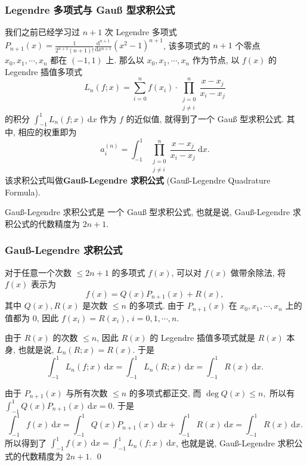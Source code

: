 
\begin{frame}
\frametitle{Legendre 多项式与 Gauß 型求积公式}

我们之前已经学习过 $n+1$ 次 Legendre 多项式 $P_{n+1}(x) = \frac{1}{2^{n+1} (n+1)!} \frac{\mathrm{d}^{n+1}}{\mathrm{d}x^{n+1}} (x^2 - 1)^{n+1}$, 该多项式的 $n+1$ 个零点 $x_0, x_1, \cdots, x_n$ 都在 $(-1, 1)$ 上. 那么以 $x_0, x_1, \cdots, x_n$ 作为节点, 以 $f(x)$ 的 Legendre 插值多项式
\[
L_n(f; x) = \sum_{i=0}^{n} f(x_i) \cdot \prod_{\substack{j=0 \\ j \neq i}}^{n} \frac{x - x_j}{x_i - x_j}
\]
的积分 $\int_{-1}^1 L_n(f; x) ~ \mathrm{d}x$ 作为 $f$ 的近似值, 就得到了一个 Gauß 型求积公式. 其中, 相应的权重即为
\[
a_i^{(n)} = \int_{-1}^1 \prod_{\substack{j=0 \\ j \neq i}}^{n} \frac{x - x_j}{x_i - x_j} ~ \mathrm{d}x.
\]
该求积公式叫做\textbf{Gauß-Legendre 求积公式} (Gauß-Legendre Quadrature Formula).

\pause

\begin{thm}
Gauß-Legendre 求积公式是 一个 Gauß 型求积公式, 也就是说, Gauß-Legendre 求积公式的代数精度为 $2n+1$.
\end{thm}

\end{frame}


\begin{frame}
\frametitle{Gauß-Legendre 求积公式}

\startproof[bg=yellow, fg=red]
对于任意一个次数 $\leqslant 2n+1$ 的多项式 $f(x)$, 可以对 $f(x)$ 做带余除法, 将 $f(x)$ 表示为
\[
f(x) = Q(x) P_{n+1}(x) + R(x),
\]
其中 $Q(x), R(x)$ 是次数 $\leqslant n$ 的多项式. 由于 $P_{n+1}(x)$ 在 $x_0, x_1, \cdots, x_n$ 上的值都为 $0$, 因此 $f(x_i) = R(x_i)$, $i = 0, 1, \cdots, n$.

\pause
\vspace{0.5em}

由于 $R(x)$ 的次数 $\leqslant n$, 因此 $R(x)$ 的 Legendre 插值多项式就是 $R(x)$ 本身, 也就是说, $L_n(R; x) = R(x)$. 于是
\[
\int_{-1}^1 L_n(f; x) ~ \mathrm{d}x = \int_{-1}^1 L_n(R; x) ~ \mathrm{d}x = \int_{-1}^1 R(x) ~ \mathrm{d}x.
\]

\pause

由于 $P_{n+1}(x)$ 与所有次数 $\leqslant n$ 的多项式都正交, 而 $\deg Q(x) \leqslant n,$ 所以有 $\int_{-1}^1 Q(x) P_{n+1}(x) ~ \mathrm{d}x = 0$. 于是
\[
\int_{-1}^1 f(x) ~ \mathrm{d}x = \int_{-1}^1 Q(x) P_{n+1}(x) ~ \mathrm{d}x + \int_{-1}^1 R(x) ~ \mathrm{d}x = \int_{-1}^1 R(x) ~ \mathrm{d}x.
\]
所以得到了 $\int_{-1}^1 f(x) ~ \mathrm{d}x = \int_{-1}^1 L_n(f; x) ~ \mathrm{d}x$, 也就是说, Gauß-Legendre 求积公式的代数精度为 $2n+1$.
\qed

\end{frame}

